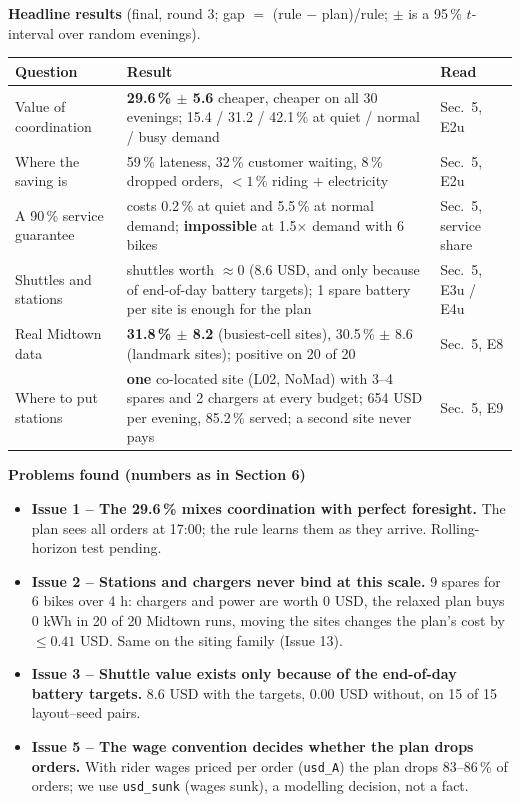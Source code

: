\noindent\textbf{Headline results} (final, round 3; gap $=$ (rule $-$ plan)/rule; $\pm$ is a 95\,\% $t$-interval over random evenings).
\begin{center}\small
\begin{tabular}{@{}L{3.0cm}L{8.2cm}L{3.7cm}@{}}
\toprule
Question & Result & Read \\
\midrule
Value of coordination & \textbf{29.6\,\% $\pm$ 5.6} cheaper, cheaper on all 30 evenings; 15.4 / 31.2 / 42.1\,\% at quiet / normal / busy demand & Sec.\ 5, E2u \\
Where the saving is & 59\,\% lateness, 32\,\% customer waiting, 8\,\% dropped orders, $<1$\,\% riding $+$ electricity & Sec.\ 5, E2u \\
A 90\,\% service guarantee & costs 0.2\,\% at quiet and 5.5\,\% at normal demand; \textbf{impossible} at 1.5$\times$ demand with 6 bikes & Sec.\ 5, service share \\
Shuttles and stations & shuttles worth $\approx 0$ (8.6 USD, and only because of end-of-day battery targets); 1 spare battery per site is enough for the plan & Sec.\ 5, E3u / E4u \\
Real Midtown data & \textbf{31.8\,\% $\pm$ 8.2} (busiest-cell sites), 30.5\,\% $\pm$ 8.6 (landmark sites); positive on 20 of 20 & Sec.\ 5, E8 \\
Where to put stations & \textbf{one} co-located site (L02, NoMad) with 3--4 spares and 2 chargers at every budget; 654 USD per evening, 85.2\,\% served; a second site never pays & Sec.\ 5, E9 \\
\bottomrule
\end{tabular}
\end{center}

\par\smallskip\noindent\textbf{Problems found (numbers as in Section 6)}\par
\begin{itemize}\small\setlength{\itemsep}{0pt}
  \item \textbf{Issue 1 -- The 29.6\,\% mixes coordination with perfect foresight.} The plan sees all orders at 17:00; the rule learns them as they arrive. Rolling-horizon test pending.
  \item \textbf{Issue 2 -- Stations and chargers never bind at this scale.} 9 spares for 6 bikes over 4 h: chargers and power are worth 0 USD, the relaxed plan buys 0 kWh in 20 of 20 Midtown runs, moving the sites changes the plan's cost by $\le 0.41$ USD. Same on the siting family (Issue 13).
  \item \textbf{Issue 3 -- Shuttle value exists only because of the end-of-day battery targets.} 8.6 USD with the targets, 0.00 USD without, on 15 of 15 layout--seed pairs.
  \item \textbf{Issue 5 -- The wage convention decides whether the plan drops orders.} With rider wages priced per order (\texttt{usd\_A}) the plan drops 83--86\,\% of orders; we use \texttt{usd\_sunk} (wages sunk), a modelling decision, not a fact.
\end{itemize}
\par\smallskip

